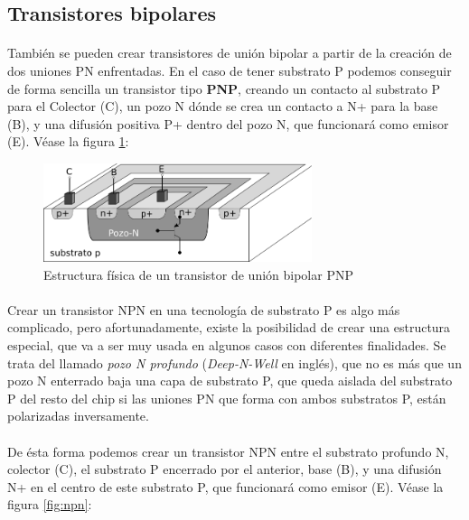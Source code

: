 \subsection{Transistores bipolares}\label{cap:bipolares}
\paragraph{}
También se pueden crear transistores de unión bipolar a partir de la creación
de dos uniones PN enfrentadas. En el caso de tener substrato P podemos conseguir
de forma sencilla un transistor tipo \textbf{PNP}, creando un contacto al substrato
P para el Colector (C), un pozo N dónde se crea un contacto a N+ para la base (B), y
una difusión positiva P+ dentro del pozo N, que funcionará como emisor (E).
Véase la figura \ref{fig:pnp}:

\begin{figure}[h]
	\centering
	\includegraphics[width=0.7\textwidth]{img/pnp.png}
	\caption{Estructura física de un transistor de unión bipolar PNP}
	\label{fig:pnp}
\end{figure}

\paragraph{}
Crear un transistor NPN en una tecnología de substrato P es algo más complicado,
pero afortunadamente, existe la posibilidad de crear una estructura especial, que
va a ser muy usada en algunos casos con diferentes finalidades. Se trata del
llamado \textit{pozo N profundo} (\textit{Deep-N-Well} en inglés), que no
es más que un pozo N enterrado baja una capa de substrato P, que queda aislada del
substrato P del resto del chip si las uniones PN que forma con ambos substratos P,
están polarizadas inversamente.

\paragraph{}
De ésta forma podemos crear un transistor NPN entre el substrato profundo N,
colector (C), el substrato P encerrado por el anterior, base (B), y una difusión
N+ en el centro de este substrato P, que funcionará como emisor (E). Véase la
figura \ref{fig:npn}:

